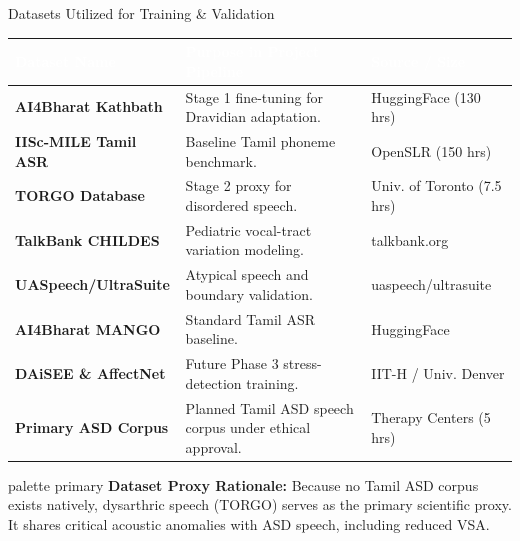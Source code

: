 \documentclass[aspectratio=169, 11pt, xcolor=table]{beamer}
\begin{document}
\begin{frame}{Datasets Utilized for Training \& Validation}
    \vspace{-0.8mm}
    \centering
    \scriptsize
    \renewcommand{\arraystretch}{1.3}
    \begin{tabularx}{\textwidth}{|>{}l|L|L|}
        \hline
        \textcolor{white}{\textbf{Dataset Name}} & \textcolor{white}{\textbf{Purpose in Project Pipeline}} & \textcolor{white}{\textbf{Source / Size}} \\
        \hline
        \textbf{AI4Bharat Kathbath} & Stage 1 fine-tuning for Dravidian adaptation. & HuggingFace (130 hrs) \\
        \hline
        \textbf{IISc-MILE Tamil ASR} & Baseline Tamil phoneme benchmark. & OpenSLR (150 hrs) \\
        \hline
        \textbf{TORGO Database} & Stage 2 proxy for disordered speech. & Univ. of Toronto (7.5 hrs) \\
        \hline
        \textbf{TalkBank CHILDES} & Pediatric vocal-tract variation modeling. & talkbank.org \\
        \hline
        \textbf{UASpeech/UltraSuite} & Atypical speech and boundary validation. & uaspeech/ultrasuite \\
        \hline
        \textbf{AI4Bharat MANGO} & Standard Tamil ASR baseline. & HuggingFace \\
        \hline
        \textbf{DAiSEE \& AffectNet} & Future Phase 3 stress-detection training. & IIT-H / Univ. Denver \\
        \hline
        \textbf{Primary ASD Corpus} & Planned Tamil ASD speech corpus under ethical approval. & Therapy Centers (5 hrs) \\
        \hline
    \end{tabularx}
    
    \vspace{0.09mm}
    \begin{beamercolorbox}[sep=2pt, left, rounded=true]{palette primary}
        \scriptsize \textbf{Dataset Proxy Rationale:} Because no Tamil ASD corpus exists natively, dysarthric speech (TORGO) serves as the primary scientific proxy. It shares critical acoustic anomalies with ASD speech, including reduced VSA.
    \end{beamercolorbox}
\end{frame}

\end{document}
